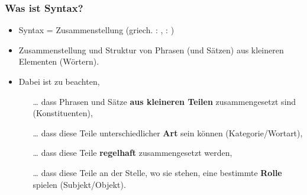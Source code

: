 \begin{frame}

\begin{figure}
	\centering
{}
\end{figure}

\end{frame}


\begin{frame}
\frametitle{Was ist Syntax?}

\begin{itemize}
	\item Syntax = Zusammenstellung (griech. : , : )
	\item[]
	\item Zusammenstellung und Struktur von Phrasen (und Sätzen) aus kleineren Elementen (Wörtern).
\end{itemize}

\nocite{Roedel16a}

\end{frame}

\begin{frame}

\begin{itemize}

	\item Dabei ist zu beachten,
	
	\begin{itemize}
		\item[\dots] dass Phrasen und Sätze \textbf{aus kleineren Teilen} zusammengesetzt sind (Konstituenten),
		\item[]
		\item [\dots] dass diese Teile unterschiedlicher \textbf{Art} sein können (Kategorie/Wortart),
		\item[]
		\item [\dots] dass diese Teile \textbf{regelhaft} zusammengesetzt werden,
		\item[]
		\item[\dots] dass diese Teile an der Stelle, wo sie stehen, eine bestimmte \textbf{Rolle} spielen (Subjekt/Objekt).
 		
	\end{itemize}
	
\end{itemize}

\end{frame}



